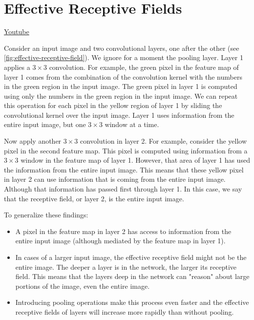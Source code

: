 \section{Effective Receptive Fields}
\href{https://www.youtube.com/watch?v=JSYoS4-Dolg&ab_channel=Udacity}{Youtube} \newline

Consider an input image and two convolutional layers, one after the other (see \autoref{fig:effective-receptive-field}). We ignore for a moment the pooling layer. Layer 1 applies a \(3 \times 3\) convolution. For example, the green pixel in the feature map of layer 1 comes from the combination of the convolution kernel with the numbers in the green region in the input image. The green pixel in layer 1 is computed using only the numbers in the green region in the input image. We can repeat this operation for each pixel in the yellow region of layer 1 by sliding the convolutional kernel over the input image.  Layer 1 uses information from the entire input image, but one \(3 \times 3\) window at a time. \newline

Now apply another \(3 \times 3\) convolution in layer 2. For example, consider the yellow pixel in the second feature map.
This pixel is computed using information from a \(3 \times 3\)  window in the feature map of layer 1.
However, that area of layer 1 has used the information from the entire input image. This means that these yellow pixel in layer 2 can use information that is coming from the entire input image. Although that information has passed first through layer 1. In this case, we say that the receptive field, or layer 2, is the entire input image. \newline

To generalize these findings: 
\begin{itemize}
    \item A pixel in the feature map in layer 2 has access to information from the entire input image (although mediated by the feature map in layer 1).
    \item In cases of a larger input image, the effective receptive field might not be the entire image. The deeper a layer is in the network, the larger its receptive field. This means that the layers deep in the network can "reason" about large portions of the image, even the entire image.
    \item Introducing pooling operations make this process even faster and the effective receptive fields of layers will increase more rapidly than without pooling.
\end{itemize}

